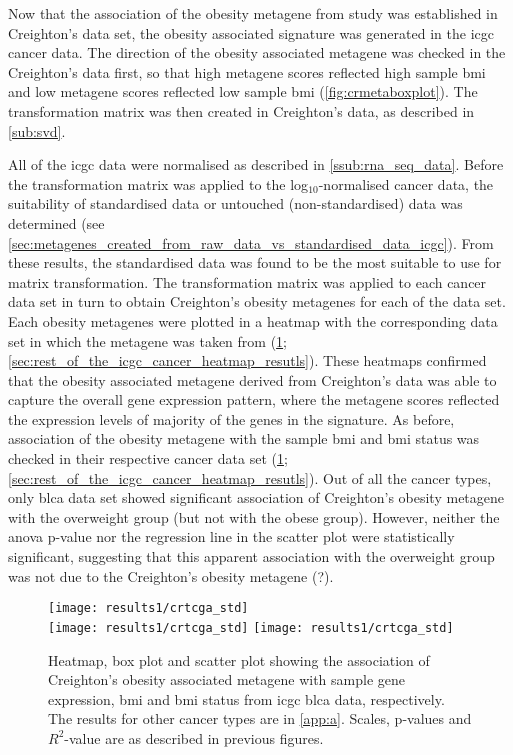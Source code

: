 \noindent
Now that the association of the obesity metagene from \citet{Creighton2012} study was established in Creighton's data set, the obesity associated signature was generated in the \gls{icgc} cancer data.
The direction of the obesity associated metagene was checked in the Creighton's data first, so that high metagene scores reflected high sample \gls{bmi} and low metagene scores reflected low sample \gls{bmi} (\cref{fig:crmetaboxplot}).
The transformation matrix was then created in Creighton's data, as described in \cref{sub:svd}.

All of the \gls{icgc} data were normalised as described in \cref{ssub:rna_seq_data}.
Before the transformation matrix was applied to the log$_{10}$-normalised cancer data, the suitability of standardised data or untouched (non-standardised) data was determined (see \cref{sec:metagenes_created_from_raw_data_vs_standardised_data_icgc}).
From these results, the standardised data was found to be the most suitable to use for matrix transformation.
The transformation matrix was applied to each cancer data set in turn to obtain Creighton's obesity metagenes for each of the data set.
Each obesity metagenes were plotted in a heatmap with the corresponding data set in which the metagene was taken from (\cref{fig:crmetaicgc}; \cref{sec:rest_of_the_icgc_cancer_heatmap_resutls}).
These heatmaps confirmed that the obesity associated metagene derived from Creighton's data was able to capture the overall gene expression pattern, where the metagene scores reflected the expression levels of majority of the genes in the signature.
As before, association of the obesity metagene with the sample \gls{bmi} and \gls{bmi} status was checked in their respective cancer data set (\cref{fig:crmetaicgc}; \cref{sec:rest_of_the_icgc_cancer_heatmap_resutls}).
Out of all the cancer types, only \gls{blca} data set showed significant association of Creighton's obesity metagene with the overweight group (but not with the obese group).
However, neither the \gls{anova} p-value nor the regression line in the scatter plot were statistically significant, suggesting that this apparent association with the overweight group was not due to the Creighton's obesity metagene (?).

\begin{figure}[htp!]
	\centering
	\texttt{[image: results1/crtcga\_std]}\\
	\vspace{1em}
	\texttt{[image: results1/crtcga\_std]}
	\hfill
	\texttt{[image: results1/crtcga\_std]}
	\caption[Creighton's metagene in \acrshort{icgc} \acrshort{blca} data]{Heatmap, box plot and scatter plot showing the association of Creighton's obesity associated metagene with sample gene expression, \gls{bmi} and \gls{bmi} status from \gls{icgc} \gls{blca} data, respectively.
	The results for other cancer types are in \cref{app:a}.
	Scales, p-values and $R^2$-value are as described in previous figures.}
	\label{fig:crmetaicgc}
\end{figure}

